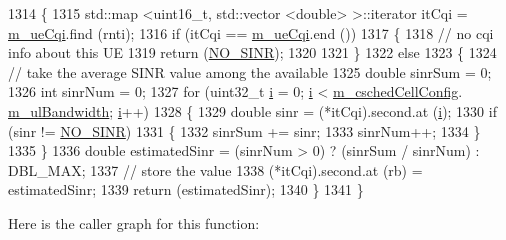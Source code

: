 \begin{DoxyCode}
1314 \{
1315   std::map <uint16\_t, std::vector <double> >::iterator itCqi = \hyperlink{classns3_1_1TdBetFfMacScheduler_a869067679aa0a846212a1fb509c1d702}{m\_ueCqi}.find (rnti);
1316   \textcolor{keywordflow}{if} (itCqi == \hyperlink{classns3_1_1TdBetFfMacScheduler_a869067679aa0a846212a1fb509c1d702}{m\_ueCqi}.end ())
1317     \{
1318       \textcolor{comment}{// no cqi info about this UE}
1319       \textcolor{keywordflow}{return} (\hyperlink{cqa-ff-mac-scheduler_8h_a520d71777be043568160c783a9c65fd5}{NO\_SINR});
1320 
1321     \}
1322   \textcolor{keywordflow}{else}
1323     \{
1324       \textcolor{comment}{// take the average SINR value among the available}
1325       \textcolor{keywordtype}{double} sinrSum = 0;
1326       \textcolor{keywordtype}{int} sinrNum = 0;
1327       \textcolor{keywordflow}{for} (uint32\_t \hyperlink{bernuolliDistribution_8m_a6f6ccfcf58b31cb6412107d9d5281426}{i} = 0; \hyperlink{bernuolliDistribution_8m_a6f6ccfcf58b31cb6412107d9d5281426}{i} < \hyperlink{classns3_1_1TdBetFfMacScheduler_a3e53aae0259501332769cd6ca4b74800}{m\_cschedCellConfig}.
      \hyperlink{structns3_1_1FfMacCschedSapProvider_1_1CschedCellConfigReqParameters_a5ab5b102878e6e7e7727a14af4a64d2f}{m\_ulBandwidth}; \hyperlink{bernuolliDistribution_8m_a6f6ccfcf58b31cb6412107d9d5281426}{i}++)
1328         \{
1329           \textcolor{keywordtype}{double} sinr = (*itCqi).second.at (\hyperlink{bernuolliDistribution_8m_a6f6ccfcf58b31cb6412107d9d5281426}{i});
1330           \textcolor{keywordflow}{if} (sinr != \hyperlink{cqa-ff-mac-scheduler_8h_a520d71777be043568160c783a9c65fd5}{NO\_SINR})
1331             \{
1332               sinrSum += sinr;
1333               sinrNum++;
1334             \}
1335         \}
1336       \textcolor{keywordtype}{double} estimatedSinr = (sinrNum > 0) ? (sinrSum / sinrNum) : DBL\_MAX;
1337       \textcolor{comment}{// store the value}
1338       (*itCqi).second.at (rb) = estimatedSinr;
1339       \textcolor{keywordflow}{return} (estimatedSinr);
1340     \}
1341 \}
\end{DoxyCode}


Here is the caller graph for this function\+:


